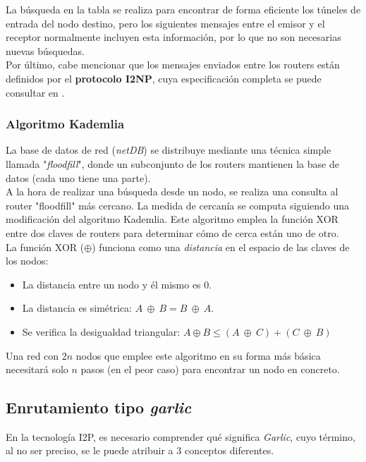 La búsqueda en la tabla se realiza para encontrar de forma eficiente los túneles de entrada del nodo destino, pero los siguientes mensajes entre el emisor y el receptor normalmente incluyen esta información, por lo que no son necesarias nuevas búsquedas.\\

Por último, cabe mencionar que los mensajes enviados entre los routers están definidos por el \textbf{protocolo I2NP}, cuya especificación completa se puede consultar en \cite{I2NP}.

\subsubsection*{Algoritmo Kademlia}


La base de datos de red (\textit{netDB}) se distribuye mediante una técnica simple llamada "\textit{floodfill}", donde un subconjunto de los routers mantienen la base de datos (cada uno tiene una parte). \\

A la hora de realizar una búsqueda desde un nodo, se realiza una consulta al router "floodfill" más cercano. La medida de cercanía se computa siguiendo una modificación del algoritmo Kademlia. Este algoritmo emplea la función XOR entre dos claves de routers para determinar cómo de cerca están uno de otro.\\

La función XOR ($\oplus$) funciona como una \textit{distancia} en el espacio de las claves de los nodos:

\begin{itemize}
	\item La distancia entre un nodo y él mismo es 0.
	\item La distancia es simétrica: $A \ \oplus \ B = B \ \oplus \ A$.
	\item Se verifica la desigualdad triangular: $A \oplus B \leq (A \ \oplus \ C) + (C \ \oplus \ B)$
\end{itemize}

Una red con $2n$ nodos que emplee este algoritmo en su forma más básica necesitará solo $n$ pasos (en el peor caso) para encontrar un nodo en concreto.



\subsection{Enrutamiento tipo \textit{garlic}}

En la tecnología I2P, es necesario comprender qué significa \textit{Garlic}, cuyo término, al no ser preciso, se le puede atribuir a 3 conceptos diferentes. 

